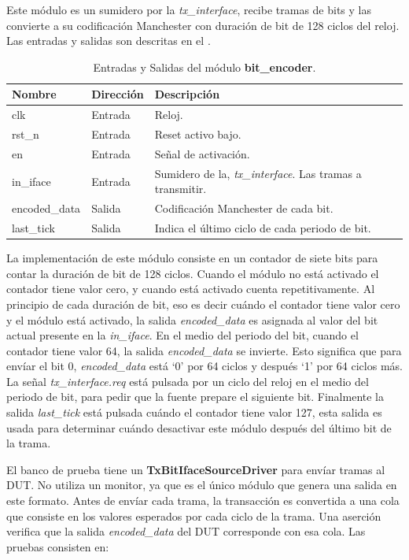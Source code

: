 \documentclass[a4paper, twoside, 11pt]{report}
\begin{document}
Este módulo es un sumidero por la \textit{tx\_interface}, recibe tramas de bits y las convierte a su codificación Manchester con duración de bit de 128 ciclos del reloj. Las entradas y salidas son descritas en el .

\begin{table}[htb]
  \centering
  \tablezebra
  \begin{tabulary}{\linewidth}{l|l|L}
    \textbf{Nombre}&\textbf{Dirección}&\textbf{Descripción} \\
    \hline
    clk&Entrada&Reloj. \\
    rst\_n&Entrada&Reset activo bajo. \\
    en&Entrada&Señal de activación. \\
    in\_iface&Entrada&Sumidero de la, \textit{tx\_interface}. Las tramas a transmitir. \\
    encoded\_data&Salida&Codificación Manchester de cada bit. \\
    last\_tick&Salida&Indica el último ciclo de cada periodo de bit. \\
  \end{tabulary}
  \caption{Entradas y Salidas del módulo \textbf{bit\_encoder}.}
  \label{tab:ports_bit_encoder}
\end{table}

La implementación de este módulo consiste en un contador de siete bits para contar la duración de bit de 128 ciclos. Cuando el módulo no está activado el contador tiene valor cero, y cuando está activado cuenta repetitivamente. Al principio de cada duración de bit, eso es decir cuándo el contador tiene valor cero y el módulo está activado, la salida \textit{encoded\_data} es asignada al valor del bit actual presente en la \textit{in\_iface}. En el medio del periodo del bit, cuando el contador tiene valor 64, la salida \textit{encoded\_data} se invierte. Esto significa que para envíar el bit 0, \textit{encoded\_data} está ‘0’ por 64 ciclos y después ‘1’ por 64 ciclos más. La señal \textit{tx\_interface.req} está pulsada por un ciclo del reloj en el medio del periodo de bit, para pedir que la fuente prepare el siguiente bit. Finalmente la salida \textit{last\_tick} está pulsada cuándo el contador tiene valor 127, esta salida es usada para determinar cuándo desactivar este módulo después del último bit de la trama.

El banco de prueba tiene un \textbf{TxBitIfaceSourceDriver} para envíar tramas al DUT. No utiliza un monitor, ya que es el único módulo que genera una salida en este formato. Antes de envíar cada trama, la transacción es convertida a una cola que consiste en los valores esperados por cada ciclo de la trama. Una aserción verifica que la salida \textit{encoded\_data} del DUT corresponde con esa cola. Las pruebas consisten en:
\end{document}
